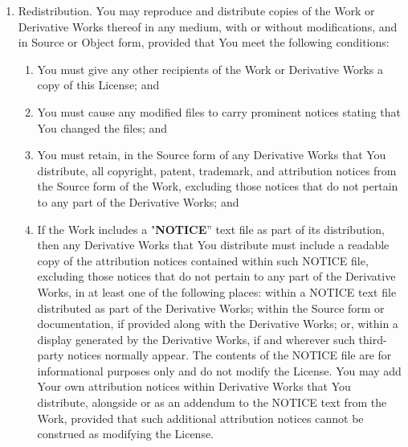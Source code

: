 \begin{enumerate}
\item Redistribution. You may reproduce and distribute copies of the Work or Derivative Works thereof in any medium, with or without modifications, and in Source or Object form, provided that You meet the following conditions:
\begin{enumerate}
\item You must give any other recipients of the Work or Derivative Works a copy of this License; and\\
\item You must cause any modified files to carry prominent notices stating that You changed the files; and\\
\item You must retain, in the Source form of any Derivative Works that You distribute, all copyright, patent, trademark, and attribution notices from the Source form of the Work, excluding those notices that do not pertain to any part of the Derivative Works; and\\
\item If the Work includes a "\textbf{NOTICE}'' text file as part of its distribution, then any Derivative Works that You distribute must include a readable copy of the attribution notices contained within such NOTICE file, excluding those notices that do not pertain to any part of the Derivative Works, in at least one of the following places: within a 		         NOTICE text file distributed as part of the Derivative Works; within the Source form or documentation, if provided along with the Derivative Works; or, within a display generated by the Derivative Works, if and wherever such third-party notices normally appear. The contents of the NOTICE file are for informational purposes only and do not 	         modify the License. You may add Your own attribution notices within Derivative Works that You distribute, alongside or as an addendum to the NOTICE text from the Work, provided that such additional attribution notices cannot be construed as modifying the License. \\


\end{enumerate}
\end{enumerate}
